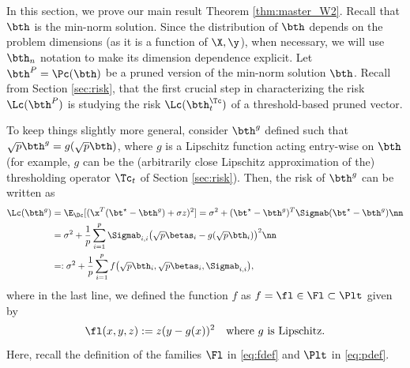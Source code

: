 {In this section, we prove our main result Theorem \ref{thm:master_W2}. Recall that $\bth$ is the min-norm solution. Since the distribution of $\bth$ depends on the problem dimensions (as it is a function of $\X,\y$), when necessary, we will use $\bth_n$ notation to make its dimension dependence explicit.} Let $\bth^P=\Pc(\bth)$ be a pruned version of the min-norm solution $\bth$. Recall from Section \ref{sec:risk}, that the first crucial step in characterizing the risk $\Lc(\bth^P)$ is studying the risk $\Lc(\bth^\Tc_t)$ of a threshold-based pruned vector. 

To keep things slightly more general,  consider $\bth^{g}$ defined such that $\sqrt{p}\bth^{g}=g(\sqrt{p}\bth)$, where $g$ is a Lipschitz function acting entry-wise on $\bth$ (for example, $g$ can be the {(arbitrarily close Lipschitz approximation of the)} thresholding operator $\Tc_t$ of Section \ref{sec:risk}). Then,  the risk of $\bth^g$ can be written as
\begin{align}
\Lc(\bth^g) &= \E_{\Dc}[(\x^T(\bt^\star-\bth^g) + \sigma z)^2] = \sigma^2 + (\bt^\star-\bth^g)^T\Sigmab(\bt^\star-\bth^g) \nn \\
  &= \sigma^2 + \frac{1}{p}\sum_{i=1}^p\Sigmab_{i,i}\big(\sqrt{p}\betas_i-g(\sqrt{p}\bth_i)\big)^2\nn
  \\
    &=: \sigma^2 + \frac{1}{p}\sum_{i=1}^p f\big(\sqrt{p}\bth_i,\sqrt{p}\betas_i,\Sigmab_{i,i}\big),\label{eq:risk_app_f}
\end{align}
where in the last line, we defined the function $f$ as $f=\fl\in \Fl\subset\Plt$ given by
\[
\fl(x,y,z) := z(y-g(x))^2\quad\text{where}~g~\text{is Lipschitz.}
\]
Here, recall the definition of the families $\Fl$ in \eqref{eq:fdef} and $\Plt$ in \eqref{eq:pdef}.

